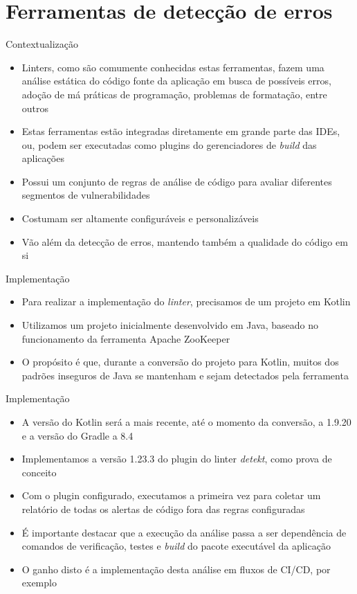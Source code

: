 \documentclass[brazilian]{beamer}
\begin{document}
\section{Ferramentas de detecção de erros}

\begin{frame}{Contextualização}
    \begin{itemize}
        \item Linters, como são comumente conhecidas estas ferramentas, fazem uma análise estática do código fonte da aplicação em busca de possíveis erros, adoção de má práticas de programação, problemas de formatação, entre outros
        \item Estas ferramentas estão integradas diretamente em grande parte das IDEs, ou, podem ser executadas como plugins do gerenciadores de \textit{build} das aplicações
        \item Possui um conjunto de regras de análise de código para avaliar diferentes segmentos de vulnerabilidades
        \item Costumam ser altamente configuráveis e personalizáveis
        \item Vão além da detecção de erros, mantendo também a qualidade do código em si
    \end{itemize}
\end{frame}

\begin{frame}{Implementação}
    \begin{itemize}
        \item Para realizar a implementação do \textit{linter}, precisamos de um projeto em Kotlin
        \item Utilizamos um projeto inicialmente desenvolvido em Java, baseado no funcionamento da ferramenta Apache ZooKeeper
        \item O propósito é que, durante a conversão do projeto para Kotlin, muitos dos padrões inseguros de Java se mantenham e sejam detectados pela ferramenta
    \end{itemize}
\end{frame}

\begin{frame}{Implementação}
    \begin{itemize}
        \item A versão do Kotlin será a mais recente, até o momento da conversão, a 1.9.20 e a versão do Gradle a 8.4
        \item Implementamos a versão 1.23.3 do plugin do linter \emph{detekt}, como prova de conceito
        \item Com o plugin configurado, executamos a primeira vez para coletar um relatório de todas os alertas de código fora das regras configuradas
        \item É importante destacar que a execução da análise passa a ser dependência de comandos de verificação, testes e \textit{build} do pacote executável da aplicação
        \item O ganho disto é a implementação desta análise em fluxos de CI/CD, por exemplo
    \end{itemize}
\end{frame}
\end{document}
